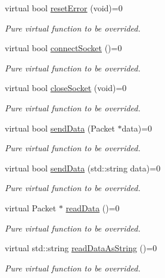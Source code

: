\begin{CompactItemize}
virtual bool \hyperlink{classXennet_1_1SocketBase_2516dbd6d571f60f61002fbe294989f9}{resetError} (void)=0
\begin{CompactList}\small\item\em Pure virtual function to be overrided. \item\end{CompactList}\item 
virtual bool \hyperlink{classXennet_1_1SocketBase_ac861f3d4a84f91e1e9532cdfdbfffdd}{connectSocket} ()=0
\begin{CompactList}\small\item\em Pure virtual function to be overrided. \item\end{CompactList}\item 
virtual bool \hyperlink{classXennet_1_1SocketBase_59a3d033e8257f08b8419fb57529c2a3}{closeSocket} (void)=0
\begin{CompactList}\small\item\em Pure virtual function to be overrided. \item\end{CompactList}\item 
virtual bool \hyperlink{classXennet_1_1SocketBase_1ca81fd73ba913d610c486b346711592}{sendData} (Packet $\ast$data)=0
\begin{CompactList}\small\item\em Pure virtual function to be overrided. \item\end{CompactList}\item 
virtual bool \hyperlink{classXennet_1_1SocketBase_1356c72d00e8a08013783a791c66f226}{sendData} (std::string data)=0
\begin{CompactList}\small\item\em Pure virtual function to be overrided. \item\end{CompactList}\item 
virtual Packet $\ast$ \hyperlink{classXennet_1_1SocketBase_1c3b53d1262bc49ce8232d2b1851ff14}{readData} ()=0
\begin{CompactList}\small\item\em Pure virtual function to be overrided. \item\end{CompactList}\item 
virtual std::string \hyperlink{classXennet_1_1SocketBase_9031aea2aaccf7623827847e6e991fc0}{readDataAsString} ()=0
\begin{CompactList}\small\item\em Pure virtual function to be overrided. \item\end{CompactList}\end{CompactItemize}
